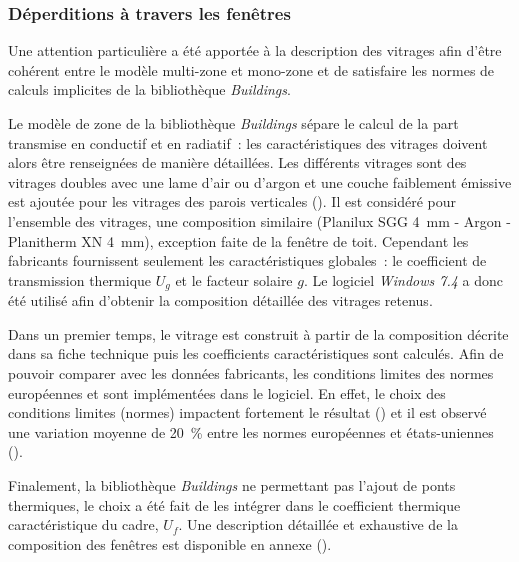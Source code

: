 \subsubsection{Déperditions à travers les fenêtres} %
\label{ssub:déperditions_à_travers_les_fenêtres}
Une attention particulière a été apportée à la description des vitrages afin
d’être cohérent entre le modèle multi-zone et mono-zone et de satisfaire les normes
de calculs implicites de la bibliothèque \textit{Buildings}.

Le modèle de zone de la bibliothèque \textit{Buildings} sépare le calcul de la part
transmise en conductif et en radiatif~: les caractéristiques des vitrages doivent alors
être renseignées de manière détaillées. Les différents vitrages sont des vitrages doubles
avec une lame d’air ou d’argon et une couche faiblement émissive est ajoutée pour les
vitrages des parois verticales (). Il est considéré pour l’ensemble
des vitrages, une composition similaire (Planilux SGG \SI{4}{mm} - Argon - Planitherm XN
\SI{4}{mm}), exception faite de la fenêtre de toit. Cependant les fabricants fournissent
seulement les caractéristiques globales~: le coefficient de transmission thermique $U_{g}$
et le facteur solaire $g$. Le logiciel \textit{Windows 7.4} a donc été utilisé afin
d’obtenir la composition détaillée des vitrages retenus.

Dans un premier temps, le vitrage est construit à partir de la composition décrite dans sa
fiche technique puis les coefficients caractéristiques sont calculés. Afin de pouvoir
comparer avec les données fabricants, les conditions limites des normes européennes
 et  sont implémentées dans le logiciel.
En effet, le choix des conditions limites (normes) impactent fortement le résultat
() et il est observé une variation moyenne de \SI{20}{\percent}
entre les normes européennes et états-uniennes ().

Finalement, la bibliothèque \textit{Buildings} ne permettant pas l’ajout de ponts
thermiques, le choix a été fait de les intégrer dans le coefficient thermique
caractéristique du cadre, $U_{f}$. Une description détaillée et exhaustive de la
composition des fenêtres est disponible en annexe ().


